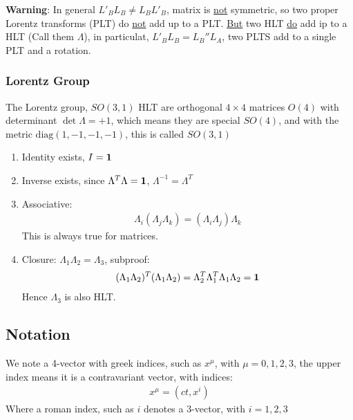 \textbf{Warning}: In general $L'_BL_B\neq L_BL'_B$, matrix is \underline{not} symmetric, so two proper Lorentz transforms (PLT) do \underline{not} add up to a PLT. \underline{But} two HLT \underline{do} add ip to a HLT (Call them $\Lambda$), in particulat, $L'_BL_B=L_B''L_A$, two PLTS add to a single PLT and a rotation.

\subsubsection{Lorentz Group}
The Lorentz group, $SO(3,1)$ HLT are orthogonal $4\times4$ matrices $O(4)$ with determinant $\det\Lambda=+1$, which means they are special $SO(4)$, and with the metric $\mathrm{diag}(1,-1,-1,-1)$, this is called $SO(3,1)$
\begin{note}
  \begin{enumerate}
  \item Identity exists, $I=\bm{1}$
  \item Inverse exists, since $\Lambda^T\Lambda=\bm{1}$, $\Lambda^{-1}=\Lambda^T$
  \item Associative:
    \begin{align*}
      \Lambda_i(\Lambda_j\Lambda_k)=(\Lambda_i\Lambda_j)\Lambda_k
    \end{align*}
    This is always true for matrices.
  \item Closure: $\Lambda_1\Lambda_2=\Lambda_3$, subproof:
    \begin{align*}
      (\Lambda_1\Lambda_2)^T(\Lambda_1\Lambda_2)=
      \Lambda_2^T\Lambda_1^T\Lambda_1\Lambda_2=\bm{1}
    \end{align*}
    Hence $\Lambda_3$ is also HLT.
  \end{enumerate}
\end{note}

\subsection{Notation}
We note a 4-vector with greek indices, such as $x^\mu$, with $\mu=0,1,2,3$, the upper index means it is a contravariant vector, with indices:
\begin{align*}
  x^\mu=(ct,x^i)
\end{align*}
Where a roman index, such as $i$ denotes a 3-vector, with $i=1,2,3$

